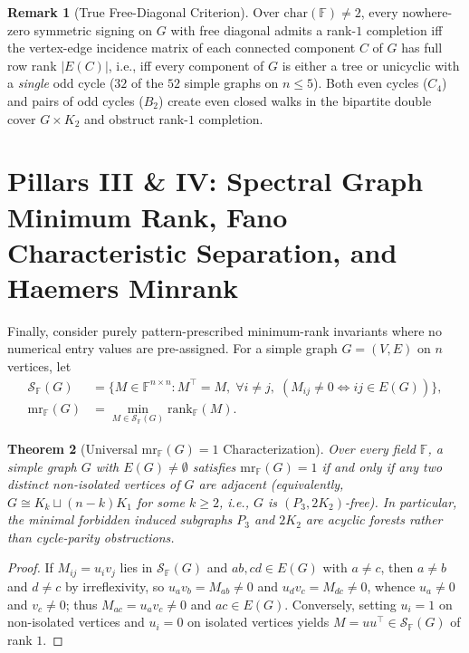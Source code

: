 \documentclass[11pt]{article}
\newtheorem{theorem}{Theorem}[section]
\theoremstyle{definition}
\newtheorem{remark}[theorem]{Remark}
\newcommand{\F}{\mathbb{F}}
\newcommand{\mr}{\mathrm{mr}}
\newcommand{\rk}{\mathrm{rank}}
\begin{document}
\begin{remark}[True Free-Diagonal Criterion]
Over $\mathrm{char}(\F)\neq 2$, every nowhere-zero symmetric signing on $G$ with free diagonal admits a rank-$1$ completion iff the vertex-edge incidence matrix of each connected component $C$ of $G$ has full row rank $|E(C)|$, i.e., iff every component of $G$ is either a tree or unicyclic with a \emph{single} odd cycle ($32$ of the $52$ simple graphs on $n\le 5$). Both even cycles ($C_4$) and pairs of odd cycles ($B_2$) create even closed walks in the bipartite double cover $G \times K_2$ and obstruct rank-$1$ completion.
\end{remark}

\section{Pillars III \& IV: Spectral Graph Minimum Rank, Fano Characteristic Separation, and Haemers Minrank}

Finally, consider purely pattern-prescribed minimum-rank invariants where no numerical entry values are pre-assigned. For a simple graph $G=(V,E)$ on $n$ vertices, let
\begin{align*}
\mathcal{S}_{\F}(G) &= \{M \in \F^{n\times n} : M^\top = M,\; \forall i\neq j,\; (M_{ij}\neq 0 \iff ij \in E(G))\}, \\
\mr_{\F}(G) &= \min_{M\in\mathcal{S}_{\F}(G)} \rk_{\F}(M).
\end{align*}

\begin{theorem}[Universal $\mr_{\F}(G)=1$ Characterization]\label{thm:graph-mr1}
Over every field $\F$, a simple graph $G$ with $E(G)\neq\emptyset$ satisfies $\mr_{\F}(G) = 1$ if and only if any two distinct non-isolated vertices of $G$ are adjacent (equivalently, $G \cong K_k \sqcup (n-k)K_1$ for some $k\ge 2$, i.e., $G$ is $(P_3, 2K_2)$-free). In particular, the minimal forbidden induced subgraphs $P_3$ and $2K_2$ are acyclic forests rather than cycle-parity obstructions.
\end{theorem}
\begin{proof}
If $M_{ij} = u_i v_j$ lies in $\mathcal{S}_{\F}(G)$ and $ab, cd \in E(G)$ with $a\neq c$, then $a\neq b$ and $d\neq c$ by irreflexivity, so $u_a v_b = M_{ab} \neq 0$ and $u_d v_c = M_{dc} \neq 0$, whence $u_a \neq 0$ and $v_c \neq 0$; thus $M_{ac} = u_a v_c \neq 0$ and $ac \in E(G)$. Conversely, setting $u_i = 1$ on non-isolated vertices and $u_i = 0$ on isolated vertices yields $M = u u^\top \in \mathcal{S}_{\F}(G)$ of rank $1$.
\end{proof}
\end{document}
